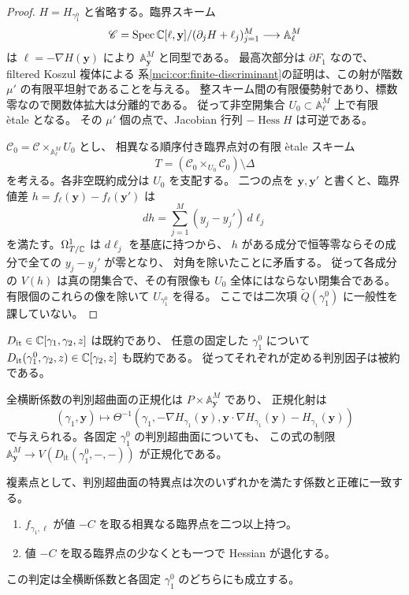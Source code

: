 \begin{proof}
$H=H_{\gamma_1^0}$ と省略する。臨界スキーム
\[
 \mathscr C=
 \operatorname{Spec}\mathbb C[\ell,\mathbf y]/(\partial_jH+\ell_j)_{j=1}^M
       \longrightarrow\mathbb A^M_\ell
\]
は $\ell=-\nabla H(\mathbf y)$ により $\mathbb A^M_{\mathbf y}$ と同型である。
最高次部分は $\partial F_1$ なので、filtered Koszul 複体による
系\ref{mci:cor:finite-discriminant}の証明は、この射が階数 $\mu'$ の有限平坦射であることを与える。
整スキーム間の有限優勢射であり、標数零なので関数体拡大は分離的である。
従って非空開集合 $U_0\subset\mathbb A^M_\ell$ 上で有限 \`etale となる。
その $\mu'$ 個の点で、Jacobian 行列 $-\operatorname{Hess}H$ は可逆である。

$\mathscr C_0=\mathscr C\times_{\mathbb A^M_\ell}U_0$ とし、
相異なる順序付き臨界点対の有限 \`etale スキーム
\[
 T=(\mathscr C_0\times_{U_0}\mathscr C_0)\setminus\Delta
\]
を考える。各非空既約成分は $U_0$ を支配する。
二つの点を $\mathbf y,\mathbf y'$ と書くと、臨界値差
$h=f_\ell(\mathbf y)-f_\ell(\mathbf y')$ は
\begin{equation}\label{mtd:eq:critical-value-differential}
                  dh=\sum_{j=1}^M(y_j-y_j')\,d\ell_j
\end{equation}
を満たす。$\Omega^1_{T/\mathbb C}$ は $d\ell_j$ を基底に持つから、
$h$ がある成分で恒等零ならその成分で全ての $y_j-y_j'$ が零となり、
対角を除いたことに矛盾する。
従って各成分の $V(h)$ は真の閉集合で、その有限像も
$U_0$ 全体にはならない閉集合である。
有限個のこれらの像を除いて $U_{\gamma_1^0}$ を得る。
ここでは二次項 $\widetilde Q(\gamma_1^0)$ に一般性を課していない。
\end{proof}

\begin{theorem}
\label{mtd:thm:normalization}
$D_{\mathrm{it}}\in\mathbb C[\gamma_1,\gamma_2,z]$ は既約であり、
任意の固定した $\gamma_1^0$ について
$D_{\mathrm{it}}(\gamma_1^0,\gamma_2,z)\in\mathbb C[\gamma_2,z]$ も既約である。
従ってそれぞれが定める判別因子は被約である。

全横断係数の判別超曲面の正規化は $P\times\mathbb A^M_{\mathbf y}$ であり、
正規化射は
\begin{equation}\label{mtd:eq:normalization}
 (\gamma_1,\mathbf y)\longmapsto
 \Theta^{-1}\!\left(
 \gamma_1,-\nabla H_{\gamma_1}(\mathbf y),
 \mathbf y\cdot\nabla H_{\gamma_1}(\mathbf y)-H_{\gamma_1}(\mathbf y)
 \right)
\end{equation}
で与えられる。各固定 $\gamma_1^0$ の判別超曲面についても、
この式の制限 $\mathbb A^M_{\mathbf y}\to V(D_{\mathrm{it}}(\gamma_1^0,-,-))$
が正規化である。

複素点として、判別超曲面の特異点は次のいずれかを満たす係数と正確に一致する。
\begin{enumerate}
 \item $f_{\gamma_1,\ell}$ が値 $-C$ を取る相異なる臨界点を二つ以上持つ。
 \item 値 $-C$ を取る臨界点の少なくとも一つで Hessian が退化する。
\end{enumerate}
この判定は全横断係数と各固定 $\gamma_1^0$ のどちらにも成立する。
\end{theorem}

